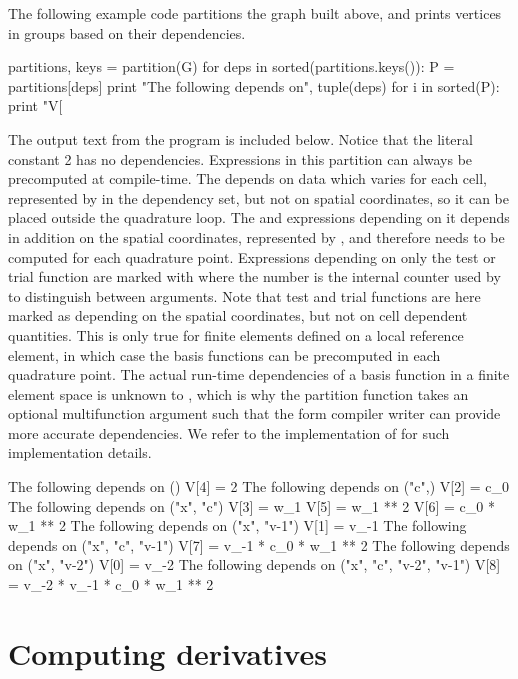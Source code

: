 The following example code partitions the graph built above, and prints
vertices in groups based on their dependencies.
\begin{python}
partitions, keys = partition(G)
for deps in sorted(partitions.keys()):
    P = partitions[deps]
    print "The following depends on", tuple(deps)
    for i in sorted(P):
        print "V[%
\end{python}
The output text from the program is included below.  Notice that the
literal constant 2 has no dependencies. Expressions in this partition can
always be precomputed at compile-time. The   depends
on data which varies for each cell, represented by  in the dependency
set, but not on spatial coordinates, so it can be placed outside the
quadrature loop. The   and expressions depending
on it depends in addition on the spatial coordinates, represented by
, and therefore needs to be computed for each quadrature point.
Expressions depending on only the test or trial function are marked
with  where the number is the internal counter used by \ufl{} to
distinguish between arguments.  Note that test and trial functions are
here marked as depending on the spatial coordinates, but not on cell
dependent quantities. This is only true for finite elements defined
on a local reference element, in which case the basis functions can be
precomputed in each quadrature point.  The actual run-time dependencies
of a basis function in a finite element space is unknown to \ufl{},
which is why the partition function takes an optional multifunction
argument such that the form compiler writer can provide more accurate
dependencies. We refer to the implementation of  for such
implementation details.
\begin{gencode}
The following depends on ()
V[4] = 2
The following depends on ("c",)
V[2] = c_0
The following depends on ("x", "c")
V[3] = w_1
V[5] = w_1 ** 2
V[6] = c_0 * w_1 ** 2
The following depends on ("x", "v-1")
V[1] = v_{-1}
The following depends on ("x", "c", "v-1")
V[7] = v_{-1} * c_0 * w_1 ** 2
The following depends on ("x", "v-2")
V[0] = v_{-2}
The following depends on ("x", "c", "v-2", "v-1")
V[8] = v_{-2} * v_{-1} * c_0 * w_1 ** 2
\end{gencode}

\section{Computing derivatives} \label{ufl:sec:ad}

